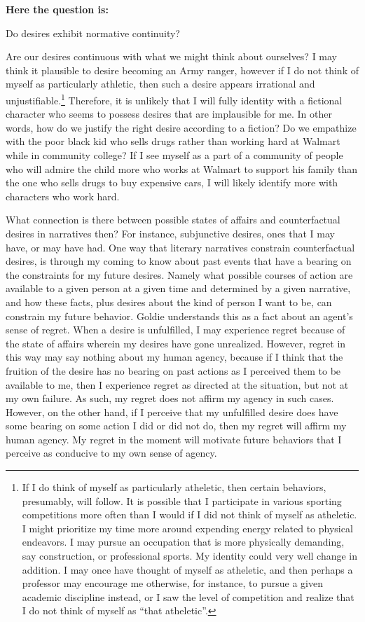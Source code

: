 \documentclass[phdthesis,12pt,final]{wuthesis}
\theoremstyle{definition}
\theoremstyle{definition}
\theoremstyle{definition}
\theoremstyle{definition}
\theoremstyle{remark}
\begin{document}
\textbf{Here the question is:}

Do desires exhibit normative continuity?

Are our desires continuous with what we might think about ourselves? I may think it plausible to desire becoming an Army ranger, however if I do not think of myself as particularly athletic, then such a desire appears irrational and unjustifiable.\footnote{If I do think of myself as particularly atheletic, then certain behaviors, presumably, will follow. It is possible that I participate in various sporting competitions more often than I would if I did not think of myself as atheletic. I might prioritize my time more around expending energy related to physical endeavors. I may pursue an occupation that is more physically demanding, say construction, or professional sports. My identity could very well change in addition. I may once have thought of myself as atheletic, and then perhaps a professor may encourage me otherwise, for instance, to pursue a given academic discipline instead, or I saw the level of competition and realize that I do not think of myself as ``that atheletic''.} Therefore, it is unlikely that I will fully identity with a fictional character who seems to possess desires that are implausible for me. In other words, how do we justify the right desire according to a fiction? Do we empathize with the poor black kid who sells drugs rather than working hard at Walmart while in community college? If I see myself as a part of a community of people who will admire the child more who works at Walmart to support his family than the one who sells drugs to buy expensive cars, I will likely identify more with characters who work hard.

What connection is there between possible states of affairs and counterfactual desires in narratives then? For instance, subjunctive desires, ones that I may have, or may have had. One way that literary narratives constrain counterfactual desires, is through my coming to know about past events that have a bearing on the constraints for my future desires. Namely what possible courses of action are available to a given person at a given time and determined by a given narrative, and how these facts, plus desires about the kind of person I want to be, can constrain my future behavior. Goldie understands this as a fact about an agent's sense of regret. When a desire is unfulfilled, I may experience regret because of the state of affairs wherein my desires have gone unrealized. However, regret in this way may say nothing about my human agency, because if I think that the fruition of the desire has no bearing on past actions as I perceived them to be available to me, then I experience regret as directed at the situation, but not at my own failure. As such, my regret does not affirm my agency in such cases. However, on the other hand, if I perceive that my unfulfilled desire does have some bearing on some action I did or did not do, then my regret will affirm my human agency. My regret in the moment will motivate future behaviors that I perceive as conducive to my own sense of agency.
\end{document}
